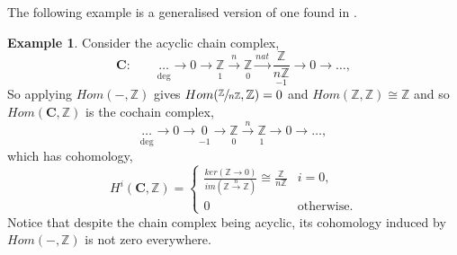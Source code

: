 \documentclass[11.5pt, twoside, a4paper, titlepage]{report}
\providecommand{\bb}[1]{\mathbb{#1}}
\theoremstyle{definition}
\newtheorem{eg}[mydef]{Example}
\theoremstyle{plain}
\begin{document}
The following example is a generalised version of one found in \cite{CB1}.

\begin{eg}
Consider the acyclic chain complex, 
\begin{equation*}
\mathbf{C}: \qquad \underset{\text{deg}}{\underset{}{\dots}} \xrightarrow{}0 \xrightarrow{} \underset{1}{\underset{}{\bb{Z}}} \xrightarrow{n} \underset{0}{\underset{}{\bb{Z}}} \xrightarrow{nat} \underset{-1}{\frac{\bb{Z}}{n\bb{Z}}} \xrightarrow{}0 \xrightarrow{} \dots,
\end{equation*}
So applying $Hom(-, \bb{Z})$ gives $Hom(\sfrac{\bb{Z}}{n\bb{Z}}, \bb{Z})=0$ and $Hom(\bb{Z}, \bb{Z})\cong\bb{Z}$ and so $Hom(\mathbf{C}, \bb{Z})$ is the cochain complex,
\begin{equation*}
\underset{\text{deg}}{\underset{}{\dots}} \xrightarrow{}0 \xrightarrow{} \underset{-1}{\underset{}{0}} \xrightarrow{} \underset{0}{\underset{}{\bb{Z}}} \xrightarrow{n} \underset{1}{\underset{}{\bb{Z}}} \xrightarrow{}0 \xrightarrow{} \dots,
\end{equation*}
which has cohomology,
\begin{equation*}
H^i(\mathbf{C}, \bb{Z})=
\begin{cases}
\frac{ker(\bb{Z}\to0)}{im(\bb{Z}\xrightarrow{n}\bb{Z})} \cong \frac{\bb{Z}}{n\bb{Z}} & i=0, \\
0 & \text{otherwise.}
\end{cases}
\end{equation*}
Notice that despite the chain complex being acyclic, its cohomology induced by $Hom(-, \bb{Z})$  is not zero everywhere.
\end{eg}
\end{document}
